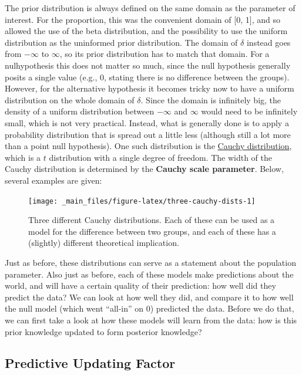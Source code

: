 \documentclass[
]{book}
\begin{document}
The prior distribution is always defined on the same domain as the parameter of interest. For the proportion, this was the convenient domain of {[}0, 1{]}, and so allowed the use of the beta distribution, and the possibility to use the uniform distribution as the uninformed prior distribution. The domain of \(\delta\) instead goes from \(-\infty\) to \(\infty\), so its prior distribution has to match that domain. For a nulhypothesis this does not matter so much, since the null hypothesis generally posits a single value (e.g., 0, stating there is no difference between the groups). However, for the alternative hypothesis it becomes tricky now to have a uniform distribution on the whole domain of \(\delta\). Since the domain is infinitely big, the density of a uniform distribution between \(-\infty\) and \(\infty\) would need to be infinitely small, which is not very practical. Instead, what is generally done is to apply a probability distribution that is spread out a little less (although still a lot more than a point null hypothesis). One such distribution is the \href{https://en.wikipedia.org/wiki/Cauchy_distribution}{Cauchy distribution}, which is a \(t\) distribution with a single degree of freedom. The width of the Cauchy distribution is determined by the \textbf{Cauchy scale parameter}. Below, several examples are given:

\begin{figure}

{\centering \texttt{[image: \_main\_files/figure-latex/three-cauchy-dists-1]} 

}

\caption{Three different Cauchy distributions. Each of these can be used as a model for the difference between two groups, and each of these has a (slightly) different theoretical implication.}\label{fig:three-cauchy-dists}
\end{figure}

Just as before, these distributions can serve as a statement about the population parameter. Also just as before, each of these models make predictions about the world, and will have a certain quality of their prediction: how well did they predict the data? We can look at how well they did, and compare it to how well the null model (which went ``all-in'' on 0) predicted the data. Before we do that, we can first take a look at how these models will learn from the data: how is this prior knowledge updated to form posterior knowledge?

\hypertarget{predictive-updating-factor}{%
\subsection{Predictive Updating Factor}\label{predictive-updating-factor}}
\end{document}
